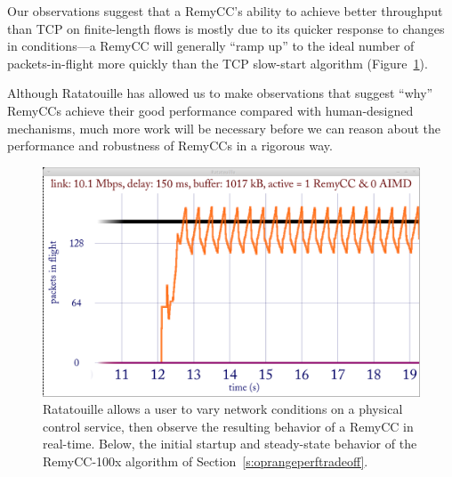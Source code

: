 Our observations suggest that a RemyCC's ability to achieve better
throughput than TCP on finite-length flows is mostly due to its
quicker response to changes in conditions---a RemyCC will generally
``ramp up'' to the ideal number of packets-in-flight more quickly than
the TCP slow-start algorithm (Figure~\ref{fig:ratscreen}).

Although Ratatouille has allowed us to make observations that suggest
``why'' RemyCCs achieve their good performance compared with
human-designed mechanisms, much more work will be necessary before we
can reason about the performance and robustness of RemyCCs in a
rigorous way.

\begin{figure}
\caption{Ratatouille allows a user to vary network conditions on a
  physical control service, then observe the resulting behavior of a
  RemyCC in real-time. Below, the initial startup and steady-state
  behavior of the RemyCC-100x algorithm of Section~\ref{s:oprangeperftradeoff}.}
\label{fig:ratscreen}

\begin{center}

\includegraphics[width=0.85 \textwidth]{ratatouille.png}

\end{center}
\end{figure}
